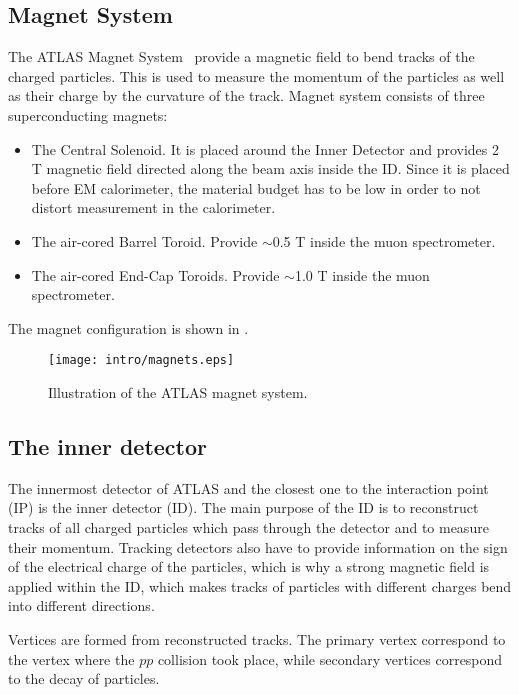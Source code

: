 \subsection{Magnet System}
The ATLAS Magnet System~\cite{tdr_magnet} provide a magnetic field to bend tracks of the charged particles. This is used to measure the momentum of the particles as well as their charge by the curvature of the track.
Magnet system consists of three superconducting magnets:
\begin{itemize}
 \item The Central Solenoid. It is placed around the Inner Detector and provides 2 T magnetic field directed along the beam axis inside the ID. 
 Since it is placed before EM calorimeter, the material budget has to be low 
 in order to not distort measurement in the calorimeter.
 \item The air-cored Barrel Toroid. Provide $\sim$0.5 T inside the muon spectrometer.
 \item The air-cored End-Cap Toroids. Provide $\sim$1.0 T inside the muon spectrometer.
\end{itemize}
The magnet configuration is shown in .

\begin{figure}[]
  \centering
\texttt{[image: intro/magnets.eps]}
\caption{Illustration of the ATLAS magnet system.}
\label{fig:atlas_magnets}
\end{figure}

\subsection{The inner detector}
\label{sec:ID}

The innermost detector of ATLAS and the closest one to the interaction point (IP) is the inner detector (ID).
The main purpose of the ID is to reconstruct tracks of all charged particles which pass through the detector and to measure their momentum.
Tracking detectors also have to provide information on the sign of the electrical charge of the particles, 
which is why a strong magnetic field is applied within the ID, 
which makes tracks of particles with different charges bend into different directions.

Vertices are formed from reconstructed tracks. The primary vertex correspond to the vertex where the $pp$ collision took place, 
while secondary vertices correspond to the decay of particles.

